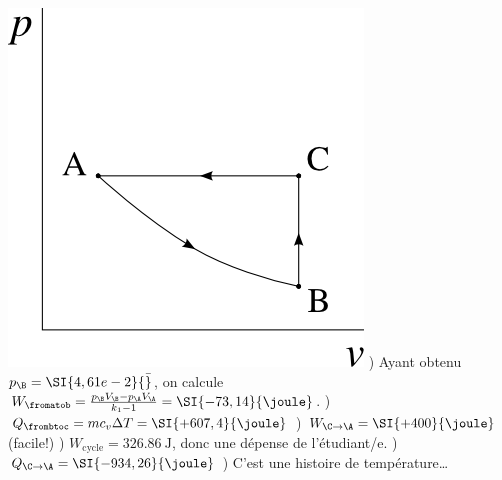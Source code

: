 \begin{description}
					\includegraphics[width=\solutiondiagramwidth]{images/exo_sol_pv_prelever.png}
					) Ayant obtenu $p_\B = \SI{4,61e-2}{\bar}$, on calcule $W_\fromatob = \frac{p_\B V_\B - p_\A V_\A}{k_1 - 1} = \SI{-73,14}{\joule}$.
					) $Q_\frombtoc = m c_v \Delta T = \SI{+607,4}{\joule}$
					) $W_{\C \to \A} = \SI{+400}{\joule}$ (facile!)
					) $W_\text{cycle} = \SI{+326,86}{\joule}$, donc une dépense de l’étudiant/e.
					) $Q_{\C \to \A} = \SI{-934,26}{\joule}$
					) C’est une histoire de température\ldots
\end{description}

